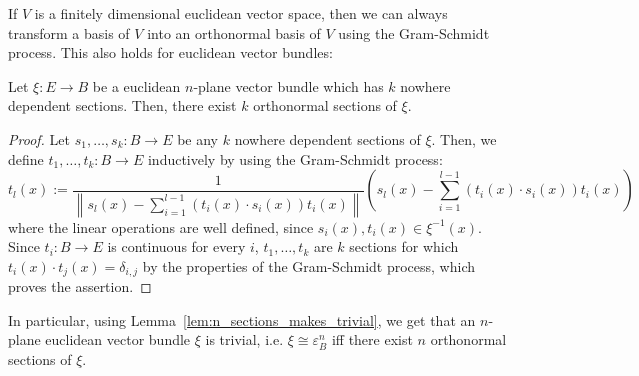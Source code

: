 If $V$ is a finitely dimensional euclidean vector space, then we can always transform a basis of $V$ into an orthonormal basis of $V$ using the Gram-Schmidt process. This also holds for euclidean vector bundles:
\begin{lemma}\label{lem:orthonormal_sections} Let $\xi:E\to B$ be a euclidean $n$-plane vector bundle which has $k$ nowhere dependent sections. Then, there exist $k$ orthonormal sections of $\xi$.
\end{lemma}
\begin{proof} Let $s_1,\ldots,s_k:B\to E$ be any $k$ nowhere dependent sections of $\xi$. Then, we define $t_1,\ldots,t_k:B\to E$ inductively by using the Gram-Schmidt process:
\[t_l(x):=\frac{1}{\left\|s_l(x)-\sum_{i=1}^{l-1}(t_i(x)\cdot s_i(x))t_i(x)\right\|}\left(s_l(x)-\sum_{i=1}^{l-1}(t_i(x)\cdot s_i(x))t_i(x)\right)\]
where the linear operations are well defined, since $s_i(x),t_i(x)\in\xi^{-1}(x)$. Since $t_i:B\to E$ is continuous for every $i$, $t_1,\ldots,t_k$ are $k$ sections for which $t_i(x)\cdot t_j(x)=\delta_{i,j}$ by the properties of the Gram-Schmidt process, which proves the assertion.
\end{proof}
\begin{remark}\label{rem:trivial_euclidian} In particular, using Lemma~\ref{lem:n_sections_makes_trivial}, we get that an $n$-plane euclidean vector bundle $\xi$ is trivial, i.e. $\xi\cong\varepsilon_B^n$ iff there exist $n$ orthonormal sections of $\xi$.
\end{remark}

